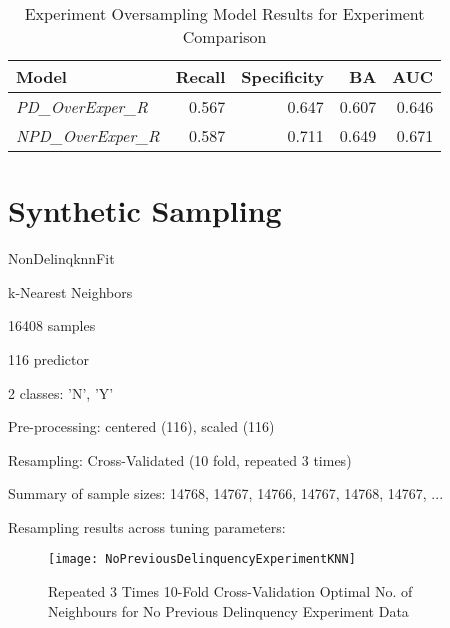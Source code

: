 \begin{table}[H]
\centering
\small
		\begin{tabular}{l  r r r r}
			\hline
			\textbf{Model} & \textbf{Recall} & \textbf{Specificity} & \textbf{BA} & \textbf{AUC}  \\ \hline
			\textit{PD\_OverExper\_R}  & 0.567 & 0.647 & 0.607 & 0.646   \\ \hline
			\textit{NPD\_OverExper\_R} & 0.587 & 0.711 & 0.649 & 0.671   \\ \hline
		\end{tabular}
	\caption{Experiment Oversampling Model Results for Experiment Comparison}
	\label{table:benchmodelOverExper}
\end{table}



\section{Synthetic Sampling}
NonDelinqknnFit

k-Nearest Neighbors 


16408 samples

116 predictor

2 classes: 'N', 'Y' 


Pre-processing: centered (116), scaled (116) 

Resampling: Cross-Validated (10 fold, repeated 3 times) 

Summary of sample sizes: 14768, 14767, 14766, 14767, 14768, 14767, ... 

Resampling results across tuning parameters:

\begin{figure}[H]
	\texttt{[image: NoPreviousDelinquencyExperimentKNN]}
	\caption{Repeated 3 Times 10-Fold Cross-Validation Optimal No. of Neighbours for No Previous Delinquency Experiment Data}
	\label{fig:NoPreviousDelinquencyExperimentKNN}
\end{figure}

